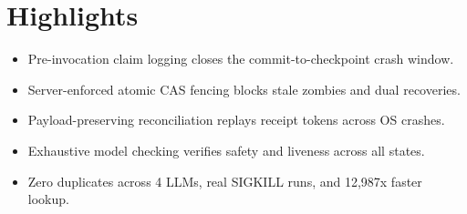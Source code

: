 \documentclass[11pt]{article}
\begin{document}
\section*{Highlights}
\begin{itemize}
  \item Pre-invocation claim logging closes the commit-to-checkpoint crash window.
  \item Server-enforced atomic CAS fencing blocks stale zombies and dual recoveries.
  \item Payload-preserving reconciliation replays receipt tokens across OS crashes.
  \item Exhaustive model checking verifies safety and liveness across all states.
  \item Zero duplicates across 4 LLMs, real SIGKILL runs, and 12,987x faster lookup.
\end{itemize}
\end{document}
